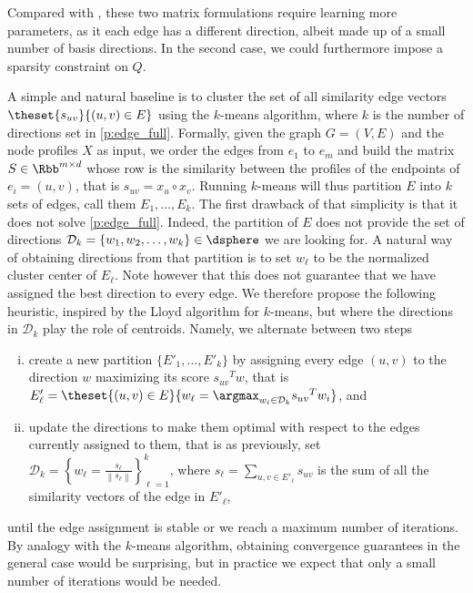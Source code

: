 Compared with , these two matrix formulations require learning more parameters,
as it each edge has a different direction, albeit made up of a small number of basis directions. In
the second case, we could furthermore impose a sparsity constraint on $Q$.

A simple and natural baseline is to cluster the set of all similarity edge vectors $
\theset{s_{uv}}{(u,v) \in E}$ using the $k$-means algorithm, where $k$ is the number of directions
set in \autoref{p:edge_full}. Formally, given the graph $G=(V,E)$ and the node profiles $X$ as
input, we order the edges from $e_1$ to $e_m$ and build the matrix $S \in \Rbb^{m\times d}$ whose
\ith{} row is the similarity between the profiles of the endpoints of $e_i=(u,v)$, that is $s_{uv} =
x_u \circ x_v$. Running $k$-means will thus partition $E$ into $k$ sets of edges, call them $E_1,
\ldots, E_k$. The first drawback of that simplicity is that it does not solve \autoref{p:edge_full}.
Indeed, the partition of $E$ does not provide the set of directions $\mathcal{D}_k = \{w_1, w_2,
\ldots, w_k\} \in \dsphere$ we are looking for. A natural way of obtaining directions from that
partition is to set $w_\ell$ to be the normalized cluster center of $E_\ell$. Note however that
this does not guarantee that we have assigned the best direction to every edge. We therefore propose
the following heuristic, inspired by the Lloyd algorithm for $k$-means, but where the directions in
$\mathcal{D}_k$ play the role of centroids. Namely, we alternate between two steps
\begin{enumerate}[(i), nosep]
  \item create a new partition $\{E'_1, \ldots, E'_k\}$ by assigning every edge $(u,v)$ to the
    direction $w$ maximizing its score ${s_{uv}}^T w$, that is $E'_\ell = \theset{(u,v) \in E}{
    w_\ell = \argmax_{w_i \in \mathcal{D}_k} {s_{uv}}^T w_i}$, and
  \item update the directions to make them optimal with respect to the edges currently assigned to
    them, that is as previously, set $\mathcal{D}_k = \left\{ w_\ell = \frac{s_\ell}{\left\| s_\ell
    \right\|}\right\}_{\ell=1}^k $, where $s_\ell = \sum_{u,v \in E'_\ell} s_{uv}$ is the sum of all
    the similarity vectors of the edge in $E'_\ell$,
\end{enumerate}
until the edge assignment is stable or we reach a maximum number of iterations. By analogy with the
$k$-means algorithm, obtaining convergence guarantees in the general case would be surprising, but in
practice we expect that only a small number of iterations would be needed.
